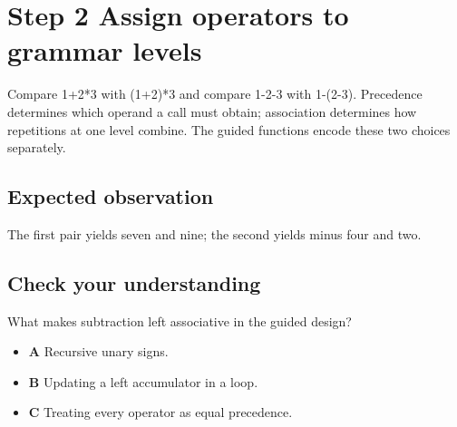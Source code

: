 \section{Step 2 Assign operators to grammar levels}\label{expression-s02}

Compare 1+2*3 with (1+2)*3 and compare 1-2-3 with 1-(2-3). Precedence determines which operand a call must obtain; association determines how repetitions at one level combine. The guided functions encode these two choices separately.

\subsection{Expected observation}
The first pair yields seven and nine; the second yields minus four and two.

\subsection{Check your understanding}
What makes subtraction left associative in the guided design?

\begin{itemize}
  \item \textbf{A} Recursive unary signs.
  \item \textbf{B} Updating a left accumulator in a loop.
  \item \textbf{C} Treating every operator as equal precedence.
\end{itemize}
